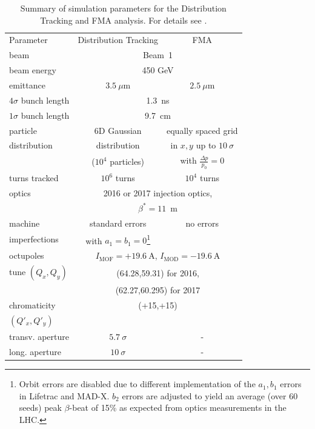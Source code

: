 \documentclass[%
 reprint,
 amsmath,amssymb,
 aps,
prstab,
]{revtex4-1}
\begin{document}
\begin{table}[b]
	\caption{\label{tab:sim_param}%
		Summary of simulation parameters for the Distribution Tracking and FMA analysis. For details see \cite{md_sim_hel_res_ex_fitterer,md_sim_hel_res_ex_fitterer_update}.
	}
	\begin{ruledtabular}
		\begin{tabular}{lcc}
			Parameter & Distribution Tracking & FMA \\
			\colrule
			beam &\multicolumn{2}{c}{Beam~1} \\
			beam energy &\multicolumn{2}{c}{450 GeV} \\
			emittance & $3.5~\mu$m& $2.5~\mu$m\\
			$4\sigma$ bunch length & \multicolumn{2}{c}{1.3~ns}\\
			$1\sigma$ bunch length & \multicolumn{2}{c}{9.7~cm}\\
			particle & 6D Gaussian & equally spaced grid\\
			distribution &  distribution & in $x,y$ up to $10~\sigma$\\
			&  ($10^4$ particles) & with $\frac{\Delta p}{p_0}=0$\\
			turns tracked & $10^6$ turns & $10^4$ turns \\\hline
			optics & \multicolumn{2}{c}{2016 or 2017 injection optics,}\\
			& \multicolumn{2}{c}{$\beta^*=11$~m}\\
			machine  & standard errors & no errors \\
			imperfections &with $a_1=b_1=0$\footnote{Orbit errors are disabled due to different implementation of the $a_1,b_1$ errors in Lifetrac and MAD-X. $b_2$ errors are adjusted to yield an average (over 60 seeds) peak $\beta$-beat of 15\% as expected from optics measurements in the LHC.} &  \\
			octupoles  & \multicolumn{2}{c}{$I_{\mathrm{MOF}}=+19.6~\mathrm{A}$, $I_{\mathrm{MOD}}=-19.6~\mathrm{A}$}\\
			tune $(Q_x,Q_y)$ & \multicolumn{2}{c}{(64.28,59.31) for 2016,}\\
			& \multicolumn{2}{c}{(62.27,60.295) for 2017}\\
			chromaticity & \multicolumn{2}{c}{(+15,+15)}\\
			 $(Q'_x,Q'_y)$ & & \\\hline
			 transv. aperture & $5.7~\sigma$ & - \\
			 long. aperture & $10~\sigma$ & - \\
		\end{tabular}
	\end{ruledtabular}
\end{table}
\end{document}
